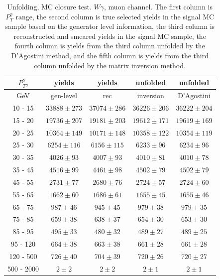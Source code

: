 \begin{table}[h]
  \scriptsize
  \begin{center}
  \caption{Unfolding, MC closure test. $W\gamma$, muon channel. The first column is $P_T^{\gamma}$ range, the second column is true selected yields in the signal MC sample based on the generator level information, the third column is reconstructed and smeared yields in the signal MC sample, the fourth column is yields from the third column unfolded by the D'Agostini method, and the fifth column is yields from the third column unfolded by the matrix inversion method. }
  \begin{tabular}{|c|c|c|c|c|}
  \hline
  $P_T^{\gamma}$, &  yields &   yields &  unfolded &  unfolded \\ \hline
  GeV &  gen-level & rec &  inversion &  D'Agostini \\ \hline
10 -  15 &     $33888\pm 273$ &     $37074\pm 286$ &     $36226\pm206$ &     $36222\pm204$ \\ \hline
 15 -  20 &     $19736\pm 207$ &     $19181\pm 203$ &     $19612\pm171$ &     $19619\pm169$ \\ \hline
 20 -  25 &     $10364\pm 149$ &     $10171\pm 148$ &     $10358\pm122$ &     $10354\pm119$ \\ \hline
 25 -  30 &     $6254\pm 116$ &     $6156\pm 115$ &     $6233\pm96$ &     $6234\pm96$ \\ \hline
 30 -  35 &     $4026\pm  93$ &     $4007\pm  93$ &     $4010\pm81$ &     $4010\pm78$ \\ \hline
 35 -  45 &     $4516\pm  99$ &     $4461\pm  98$ &     $4502\pm79$ &     $4502\pm79$ \\ \hline
 45 -  55 &     $2731\pm  77$ &     $2680\pm  76$ &     $2724\pm57$ &     $2724\pm60$ \\ \hline
 55 -  65 &     $1662\pm  60$ &     $1686\pm  61$ &     $1655\pm45$ &     $1655\pm46$ \\ \hline
 65 -  75 &     $987\pm  46$ &     $945\pm  45$ &     $979\pm38$ &     $979\pm35$ \\ \hline
 75 -  85 &     $659\pm  38$ &     $638\pm  37$ &     $654\pm30$ &     $653\pm30$ \\ \hline
 85 -  95 &     $495\pm  33$ &     $480\pm  32$ &     $489\pm27$ &     $489\pm25$ \\ \hline
 95 - 120 &     $664\pm  38$ &     $663\pm  38$ &     $661\pm28$ &     $661\pm28$ \\ \hline
120 - 500 &     $726\pm  40$ &     $704\pm  39$ &     $720\pm26$ &     $720\pm27$ \\ \hline
500 - 2000 &     $2\pm   2$ &     $2\pm   2$ &     $2\pm1$ &     $2\pm1$ \\ \hline
  \end{tabular}
  \label{tab:unf_mc_closure_MUON_WGamma}
  \end{center}
\end{table}

